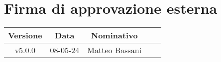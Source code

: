 \section*{Firma di approvazione esterna}
    \begin{table}[!ht]
        \centering
        \renewcommand{\arraystretch}{1.5}
        \begin{tabularx}{0.98\textwidth}
            {c c c >{\centering\arraybackslash}X X}
            \rowcolor{black}
            \textbf{\color{white} Versione} & \textbf{\color{white} Data} & \textbf{\color{white} Nominativo} & \multicolumn{2}{c}{\textbf{\color{white} Firma}}\\ 
            \hline
            
            \multirow{2}{*}{v5.0.0} &\multirow{2}{*}{08-05-24} &\multirow{2}{*}{Matteo Bassani} &&\\

            &&&\multicolumn{2}{c}{\hrulefill}\\
            \hline
        \end{tabularx}
    \end{table}
